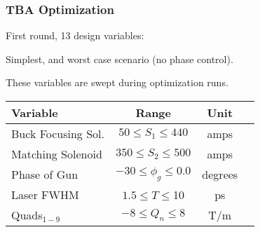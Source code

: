 \documentclass[professionalfonts,t]{beamer}
\begin{document}
\begin{frame}
\frametitle{TBA Optimization}
\vspace{-0.75em}
\begin{tikzpicture}[scale=\textwidth/26cm, text=black]

\end{tikzpicture}

\vspace{-1em}
First round, 13 design variables:

Simplest, and worst case scenario (no phase control).

These variables are swept during optimization runs.
\begin{table}[hbt] 
	\centering
	\begin{tabular}{ l *{3}{c}}
		\toprule
		\textbf{Variable} & \textbf{Range} & \textbf{Unit} \\
		\midrule
		Buck Focusing Sol. &  $ 50 \le S_1 \le 440$ & amps \\
		Matching Solenoid & $ 350 \le S_2 \le 500$  & amps \\
		Phase of Gun & $-30 \le \phi_g \le 0.0$  & degrees \\
		Laser FWHM & $1.5 \le T \le $10  & ps \\
		Quads$_{1-9}$ & $-8 \le Q_n \le 8$  & T/m \\
		\bottomrule	
	\end{tabular}
	
\end{table}
\end{frame}
\end{document}
